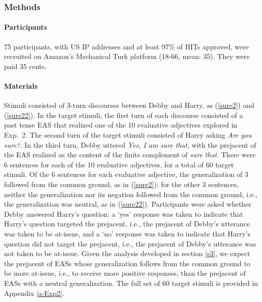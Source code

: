 \documentclass[11pt,fleqn]{article}
\newcommand{\6}{\mbox{$[\hspace*{-.6mm}[$}}
\newcommand{\9}{\mbox{$]\hspace*{-.6mm}]$}}
\begin{document}
\subsubsection{Methods}

\paragraph{Participants} 75 participants, with US IP addresses and at least 97\% of HITs approved, were recruited on Amazon's Mechanical Turk platform (18-66, mean: 35). They were paid 35 cents.

\paragraph{Materials} Stimuli consisted of 3-turn discourses between Debby and Harry, as (\ref{sure2}) and (\ref{sure22}). In the target stimuli, the first turn of each discourse consisted of a past tense EAS that realized one of the 10 evaluative adjectives explored in Exp.~2. The second turn of the target stimuli consisted of Harry asking {\em Are you sure?}. In the third turn, Debby uttered {\em Yes, I am sure that}, with the prejacent of the EAS realized as the content of the finite complement of {\em sure that}. There were 6 sentences for each of the 10 evaluative adjectives, for a total of 60 target stimuli. Of the 6 sentences for each evaluative adjective, the generalization of 3 followed from the common ground, as in (\ref{sure2}); for the other 3 sentences, neither the generalization nor its negation followed from the common ground, i.e., the generalization was neutral, as in (\ref{sure22}). Participants were asked whether Debby answered Harry's question: a `yes' response was taken to indicate that Harry's question targeted the prejacent, i.e., the prejacent of Debby's utterance was taken to be at-issue, and a `no' response was taken to indicate that Harry's question did not target the prejacent, i.e., the prejacent of Debby's utterance was not taken to be at-issue. Given the analysis developed in section \ref{s3}, we expect the prejacent of EASs whose generalization follows from the common ground to be more at-issue, i.e., to receive more positive responses, than the prejacent of EASs with a neutral generalization. The full set of 60 target stimuli is provided in Appendix \ref{a-Exp2}.
\end{document}
